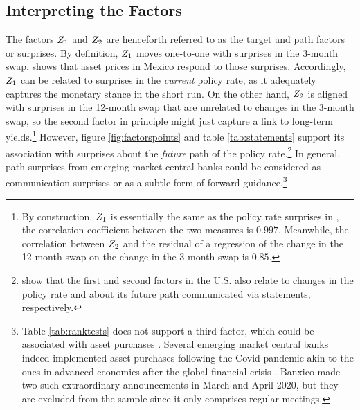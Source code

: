 {\subsection{Interpreting the Factors} \label{sec:interpretation}
\iftoggle{toclinks}{\gototoc}{} %
The factors \(Z_{1}\) and \(Z_{2}\) are henceforth referred to as the target and path factors or surprises. 
By definition, \(Z_{1}\) moves one-to-one with surprises in the 3-month swap. \textcite{Solis:FX} shows that asset prices in Mexico respond to those surprises. 
Accordingly, \(Z_{1}\) can be related to surprises in the \textit{current} policy rate, as it adequately captures the monetary stance in the short run. 
On the other hand, \(Z_{2}\) is aligned with surprises in the 12-month swap that are unrelated to changes in the 3-month swap, so the second factor in principle might just capture a link to long-term yields.\footnote{ By construction, \(Z_{1}\) is essentially the same as the policy rate surprises in \textcite{Solis:FX}, the correlation coefficient between the two measures is \(0.997\). Meanwhile, the correlation between \(Z_{2}\) and the residual of a regression of the change in the 12-month swap on the change in the 3-month swap is \(0.85\).} %
However, figure \ref{fig:factorspoints} and table \ref{tab:statements} support its association with surprises about the \textit{future} path of the policy rate.\footnote{\textcite{GSS:2005a} show that the first and second factors in the U.S. also relate to changes in the policy rate and about its future path communicated via statements, respectively.} 
In general, path surprises from emerging market central banks could be considered as communication surprises or as a subtle form of forward guidance.\footnote{Table \ref{tab:ranktests} does not support a third factor, which could be associated with asset purchases \parencite{Swanson:2021}. Several emerging market central banks indeed implemented asset purchases following the Covid pandemic akin to the ones in advanced economies after the global financial crisis \parencite{RebucciHartleyJimenez:2021}. Banxico made two such extraordinary announcements in March and April 2020, but they are excluded from the sample since it only comprises regular meetings.} 

}
